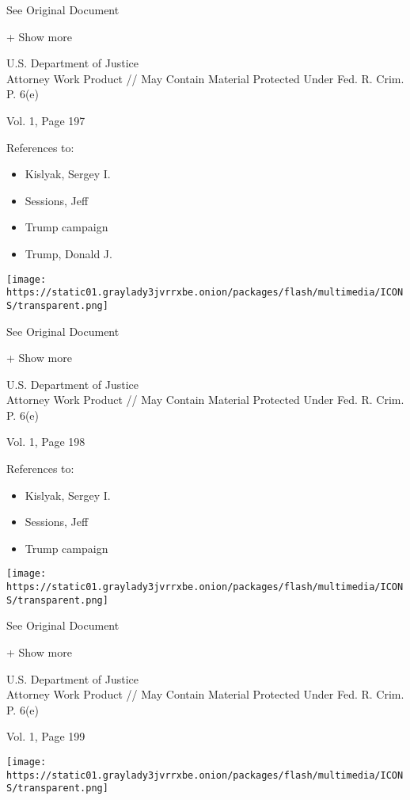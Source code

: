 See Original Document

+ Show more

U.S. Department of Justice\\
Attorney Work Product // May Contain Material Protected Under Fed. R.
Crim. P. 6(e)

Vol. 1, Page 197

References to:

\begin{itemize}
\tightlist
\item
  Kislyak, Sergey I.
\item
  Sessions, Jeff
\item
  Trump campaign
\item
  Trump, Donald J.
\end{itemize}

\protect\hyperlink{}{}

\texttt{[image: https://static01.graylady3jvrrxbe.onion/packages/flash/multimedia/ICONS/transparent.png]}

See Original Document

+ Show more

U.S. Department of Justice\\
Attorney Work Product // May Contain Material Protected Under Fed. R.
Crim. P. 6(e)

Vol. 1, Page 198

References to:

\begin{itemize}
\tightlist
\item
  Kislyak, Sergey I.
\item
  Sessions, Jeff
\item
  Trump campaign
\end{itemize}

\protect\hyperlink{}{}

\texttt{[image: https://static01.graylady3jvrrxbe.onion/packages/flash/multimedia/ICONS/transparent.png]}

See Original Document

+ Show more

U.S. Department of Justice\\
Attorney Work Product // May Contain Material Protected Under Fed. R.
Crim. P. 6(e)

Vol. 1, Page 199

\protect\hyperlink{}{}

\texttt{[image: https://static01.graylady3jvrrxbe.onion/packages/flash/multimedia/ICONS/transparent.png]}


